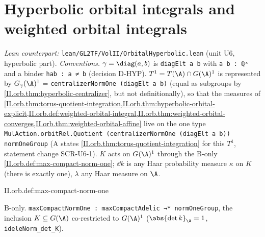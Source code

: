 \section{Hyperbolic orbital integrals and weighted orbital integrals}\label{sec:orb-hyperbolic}

\noindent\emph{Lean counterpart:} \texttt{lean/GL2TF/VolII/OrbitalHyperbolic.lean} (unit U6, hyperbolic part). \emph{Conventions.} $\gamma=\diag(a,b)$ is
\texttt{diagElt a b} with \texttt{a b : ℚˣ} and a binder \texttt{hab : a ≠ b} (decision D-HYP). $T^1=T(\A)\cap G(\A)^1$ is represented by
$G_\gamma(\A)^1$ = \texttt{centralizerNormOne (diagElt a b)} (equal as subgroups by \cref{II.orb.thm:hyperbolic-centralizer}, but not definitionally), so that the
measures of \cref{II.orb.thm:torus-quotient-integration,II.orb.thm:hyperbolic-orbital-explicit,II.orb.def:weighted-orbital-integral,II.orb.thm:weighted-orbital-converges,II.orb.thm:weighted-orbital-affine}
live on the one type \texttt{MulAction.orbitRel.Quotient (centralizerNormOne (diagElt a b)) normOneGroup} (A states \cref{II.orb.thm:torus-quotient-integration} for this
$T^1$, statement change SCR-U6-1). $K$ acts on $G(\A)^1$ through the B-only \cref{II.orb.def:max-compact-norm-one}; $\dd k$ is any Haar probability measure $\kappa$ on $K$
(there is exactly one), $\lambda$ any Haar measure on $\A$.

\begin{definition}
\bonly
{}
\end{definition}
\begin{tfformal}{II.orb.def:max-compact-norm-one}
\begin{tffidelity}
B-only. \texttt{maxCompactNormOne : maxCompactAdelic →* normOneGroup}, the inclusion $K\subseteq G(\A)$ co-restricted to $G(\A)^1$ ($\abs{\det k}_\A=1$, \texttt{ideleNorm\_det\_K}).
\end{tffidelity}
\end{tfformal}

